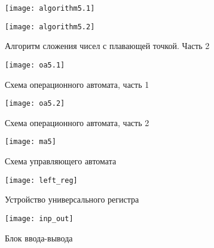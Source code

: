 \documentclass[a4paper,14pt]{extarticle}
\begin{document}
\newpage
\begin{figure}[h!]
	\centering
	\texttt{[image: algorithm5.1]}
	\label{img:algorithm5.1}
\end{figure}
\begin{figure}[h!]
	\centering
	\texttt{[image: algorithm5.2]}
	\caption {Алгоритм сложения чисел с плавающей точкой. Часть 2}
	\label{img:algorithm5.2}
\end{figure}
\newpage
\begin{figure}[h!]
	\centering
	\texttt{[image: oa5.1]}
	\caption {Схема операционного автомата, часть 1}
	\label{img:oa5.1}
\end{figure}
\begin{figure}[h!]
	\centering
	\texttt{[image: oa5.2]}
	\caption {Схема операционного автомата, часть 2}
	\label{img:oa5.2}
\end{figure}

\begin{figure}[h!]
	\centering
	\texttt{[image: ma5]}
	\caption {Схема управляющего автомата}
	\label{img:ma5}
\end{figure}
\newpage
\begin{figure}[h!]
	\centering
	\texttt{[image: left\_reg]}
	\caption {Устройство универсального регистра}
	\label{img:left_reg5}
\end{figure}

\begin{figure}[h!]
	\centering
	\texttt{[image: inp\_out]}
	\caption {Блок ввода-вывода}
	\label{img:inp_out5}
\end{figure}
\end{document}
